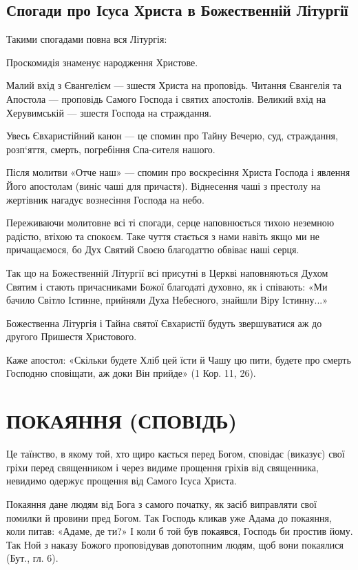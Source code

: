 \documentclass[main.tex]{subfiles}
\begin{document}
\subsection{Спогади про Ісуса Христа в Божественній Літургії}

Такими спогадами повна вся Літургія:

Проскомидія знаменує народження Христове.

Малий вхід з Євангелієм — зшестя Христа на проповідь. Читання Євангелія та Апостола — проповідь Самого Господа і святих апостолів. Великий вхід на Херувимській — зшестя Господа на страждання.

Увесь Євхаристійний канон — це спомин про Тайну Вечерю, суд, страждання, розп`яття, смерть, погребіння Спа-сителя нашого.

Після молитви «Отче наш» — спомин про воскресіння Христа Господа і явлення Його апостолам (виніс чаші для причастя). Віднесення чаші з престолу на жертівник нагадує вознесіння Господа на небо.

Переживаючи молитовне всі ті спогади, серце наповнюється тихою неземною радістю, втіхою та спокоєм. Таке чуття стається з нами навіть якщо ми не причащаємося, бо Дух Святий Своєю благодаттю обвіває наші серця.

Так що на Божественній Літургії всі присутні в Церкві наповняються Духом Святим і стають причасниками Божої благодаті духовно, як і співають: «Ми бачило Світло Істинне, прийняли Духа Небесного, знайшли Віру Істинну...»

Божественна Літургія і Тайна святої Євхаристії будуть звершуватися аж до другого Пришестя Христового.

Каже апостол: «Скільки будете Хліб цей їсти й Чашу цю пити, будете про смерть Господню сповіщати, аж доки Він прийде» (1 Кор. 11, 26).

\section{ПОКАЯННЯ (СПОВІДЬ)}

Це таїнство, в якому той, хто щиро кається перед Богом, сповідає (виказує) свої гріхи перед священником і через видиме прощення гріхів від священника, невидимо одержує прощення від Самого Ісуса Христа.

Покаяння дане людям від Бога з самого початку, як засіб виправляти свої помилки й провини пред Богом. Так Господь кликав уже Адама до покаяння, коли питав: «Адаме, де ти?» І коли б той був покаявся, Господь би простив йому. Так Ной з наказу Божого проповідував допотопним людям, щоб вони покаялися (Бут., гл. 6).
\end{document}

